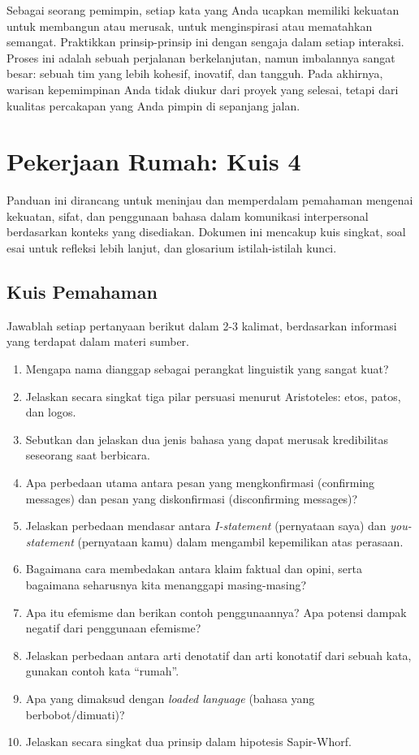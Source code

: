 \documentclass[
  letterpaper,
  DIV=11,
  numbers=noendperiod]{scrreprt}
\begin{document}
Sebagai seorang pemimpin, setiap kata yang Anda ucapkan memiliki
kekuatan untuk membangun atau merusak, untuk menginspirasi atau
mematahkan semangat. Praktikkan prinsip-prinsip ini dengan sengaja dalam
setiap interaksi. Proses ini adalah sebuah perjalanan berkelanjutan,
namun imbalannya sangat besar: sebuah tim yang lebih kohesif, inovatif,
dan tangguh. Pada akhirnya, warisan kepemimpinan Anda tidak diukur dari
proyek yang selesai, tetapi dari kualitas percakapan yang Anda pimpin di
sepanjang jalan.

\section{Pekerjaan Rumah: Kuis 4}\label{pekerjaan-rumah-kuis-4}

Panduan ini dirancang untuk meninjau dan memperdalam pemahaman mengenai
kekuatan, sifat, dan penggunaan bahasa dalam komunikasi interpersonal
berdasarkan konteks yang disediakan. Dokumen ini mencakup kuis singkat,
soal esai untuk refleksi lebih lanjut, dan glosarium istilah-istilah
kunci.

\subsection{Kuis Pemahaman}\label{kuis-pemahaman}

Jawablah setiap pertanyaan berikut dalam 2-3 kalimat, berdasarkan
informasi yang terdapat dalam materi sumber.

\begin{enumerate}
\def\labelenumi{\arabic{enumi}.}
\item
  Mengapa nama dianggap sebagai perangkat linguistik yang sangat kuat?
\item
  Jelaskan secara singkat tiga pilar persuasi menurut Aristoteles: etos,
  patos, dan logos.
\item
  Sebutkan dan jelaskan dua jenis bahasa yang dapat merusak kredibilitas
  seseorang saat berbicara.
\item
  Apa perbedaan utama antara pesan yang mengkonfirmasi (confirming
  messages) dan pesan yang diskonfirmasi (disconfirming messages)?
\item
  Jelaskan perbedaan mendasar antara \emph{I-statement} (pernyataan
  saya) dan \emph{you-statement} (pernyataan kamu) dalam mengambil
  kepemilikan atas perasaan.
\item
  Bagaimana cara membedakan antara klaim faktual dan opini, serta
  bagaimana seharusnya kita menanggapi masing-masing?
\item
  Apa itu efemisme dan berikan contoh penggunaannya? Apa potensi dampak
  negatif dari penggunaan efemisme?
\item
  Jelaskan perbedaan antara arti denotatif dan arti konotatif dari
  sebuah kata, gunakan contoh kata ``rumah''.
\item
  Apa yang dimaksud dengan \emph{loaded language} (bahasa yang
  berbobot/dimuati)?
\item
  Jelaskan secara singkat dua prinsip dalam hipotesis Sapir-Whorf.
\end{enumerate}
\end{document}
